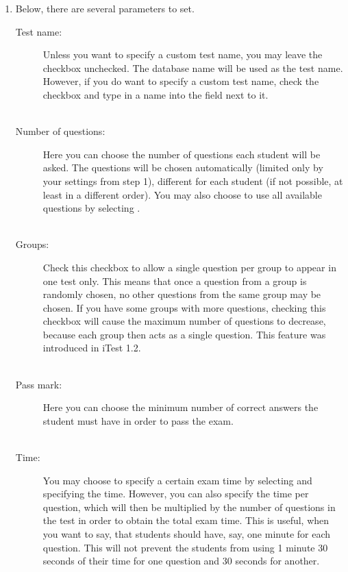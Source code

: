 \begin{enumerate}
\item Below, there are several parameters to set.

\begin{description}
\item[Test name:]
Unless you want to specify a custom test name, you may leave the checkbox unchecked.
The database name will be used as the test name.
However, if you do want to specify a custom test name, check the checkbox and type in a name into the field next to it.\\\\

\item[Number of questions:]
Here you can choose the number of questions each student will be asked.
The questions will be chosen automatically (limited only by your settings from step 1), different for each student (if not possible, at least in a different order).
You may also choose to use all available questions by selecting .\\\\

\item[Groups:]
Check this checkbox to allow a single question per group to appear in one test only.
This means that once a question from a group is randomly chosen, no other questions from the same group may be chosen.
If you have some groups with more questions, checking this checkbox will cause the maximum number of questions to decrease, because each group then acts as a single question.
This feature was introduced in iTest 1.2.\\\\

\item[Pass mark:]
Here you can choose the minimum number of correct answers the student must have in order to pass the exam.\\\\

\item[Time:]
You may choose to specify a certain exam time by selecting  and specifying the time.
However, you can also specify the time per question, which will then be multiplied by the number of questions in the test in order to obtain the total exam time.
This is useful, when you want to say, that students should have, say, one minute for each question.
This will not prevent the students from using 1 minute 30 seconds of their time for one question and 30 seconds for another.\\\\
\end{description}


\end{enumerate}
